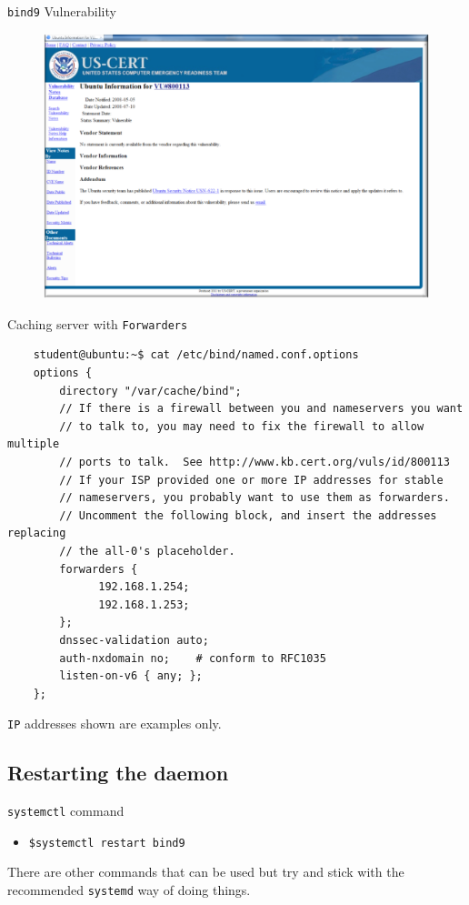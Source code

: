 \documentclass[aspectratio=169]{beamer}
\begin{document}
\begin{frame}{\texttt{bind9} Vulnerability}
  \begin{figure}
    \begin{center}
      \includegraphics[width=0.6\linewidth]{vulnerability.png}
    \end{center}
  \end{figure}
\end{frame}

\begin{frame}[fragile]{Caching server with \texttt{Forwarders}}
  \begin{lstlisting}
    student@ubuntu:~$ cat /etc/bind/named.conf.options
    options {
        directory "/var/cache/bind";
        // If there is a firewall between you and nameservers you want
        // to talk to, you may need to fix the firewall to allow multiple
        // ports to talk.  See http://www.kb.cert.org/vuls/id/800113
        // If your ISP provided one or more IP addresses for stable
        // nameservers, you probably want to use them as forwarders.
        // Uncomment the following block, and insert the addresses replacing
        // the all-0's placeholder.
        forwarders {
 		      192.168.1.254; 
		      192.168.1.253;
        };
        dnssec-validation auto;
        auth-nxdomain no;    # conform to RFC1035
        listen-on-v6 { any; };
    };
  \end{lstlisting}
  \begin{tcolorbox}[title={\textbf{NOTE:}}]
    \begin{center}
      \texttt{IP} addresses shown are examples only.      
    \end{center}
  \end{tcolorbox}
\end{frame}

\subsection{Restarting the daemon}
\begin{frame}{\texttt{systemctl} command}
  \begin{itemize}
    \item \texttt{\$systemctl restart bind9}
  \end{itemize}
  \begin{tcolorbox}[title={\textbf{NOTE:}}]
    There are other commands that can be used but try and stick with the recommended \texttt{systemd} way of doing things.
  \end{tcolorbox} 
\end{frame}
\end{document}
